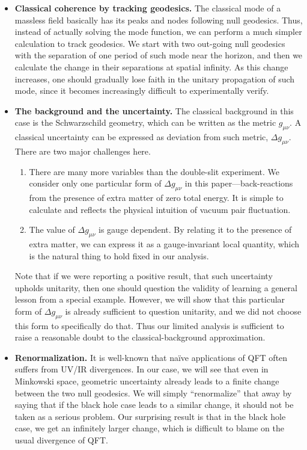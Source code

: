 \documentclass[aps,showpacs,onecolumn,floats,prd,superscriptaddress,nofootinbib]{revtex4-1}
\begin{document}
\begin{itemize}
\item {\bf Classical coherence by tracking geodesics.} The classical mode of a massless field basically has its peaks and nodes following null geodesics.
Thus, instead of actually solving the mode function, we can perform a much simpler calculation to track geodesics.
We start with two out-going null geodesics with the separation of one period of such mode near the horizon, and then we calculate the change in their separations at spatial infinity.
As this change increases, one should gradually lose faith in the unitary propagation of such mode, since it becomes increasingly difficult to experimentally verify.
\item {\bf The background and the uncertainty.} The classical background in this case is the Schwarzschild geometry, which can be written as the metric $g_{\mu\nu}$. 
A classical uncertainty can be expressed as deviation from such metric, $\Delta g_{\mu\nu}$. 
There are two major challenges here.
\begin{enumerate}
\item There are many more variables than the double-slit experiment. 
We consider only one particular form of $\Delta g_{\mu\nu}$ in this paper---back-reactions from the presence of extra matter of zero total energy. 
It is simple to calculate and reflects the physical intuition of vacuum pair fluctuation.
\item The value of $\Delta g_{\mu\nu}$ is gauge dependent. 
By relating it to the presence of extra matter, we can express it as a gauge-invariant local quantity, which is the natural thing to hold fixed in our analysis.
\end{enumerate}
Note that if we were reporting a positive result, that such uncertainty upholds unitarity, then one should question the validity of learning a general lesson from a special example. However, we will show that this particular form of $\Delta g_{\mu\nu}$ is already sufficient to question unitarity, and we did not choose this form to specifically do that. Thus our limited analysis is sufficient to raise a reasonable doubt to the classical-background approximation.
\item {\bf Renormalization.} It is well-known that na\"ive applications of QFT often suffers from UV/IR divergences.
In our case, we will see that even in Minkowski space, geometric uncertainty already leads to a finite change between the two null geodesics.
We will simply ``renormalize'' that away by saying that if the black hole case leads to a similar change, it should not be taken as a serious problem.
Our surprising result is that in the black hole case, we get an infinitely larger change, which is difficult to blame on the usual divergence of QFT.
\end{itemize}
\end{document}
